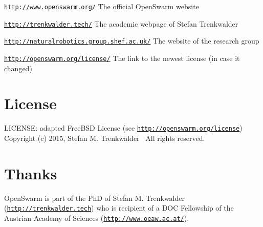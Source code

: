 \begin{DoxyItemize}
\item \href{http://www.openswarm.org/}{\tt http\+://www.\+openswarm.\+org/} The official Open\+Swarm website
\item \href{http://trenkwalder.tech/}{\tt http\+://trenkwalder.\+tech/} The academic webpage of Stefan Trenkwalder
\item \href{http://naturalrobotics.group.shef.ac.uk/}{\tt http\+://naturalrobotics.\+group.\+shef.\+ac.\+uk/} The website of the research group
\item \href{http://openswarm.org/license/}{\tt http\+://openswarm.\+org/license/} The link to the newest license (in case it changed)
\end{DoxyItemize}\hypertarget{index_base_license}{}\section{License}\label{index_base_license}
L\+I\+C\+E\+N\+S\+E\+: adapted Free\+B\+S\+D License (see \href{http://openswarm.org/license}{\tt http\+://openswarm.\+org/license})~\newline
Copyright (c) 2015, Stefan M. Trenkwalder~\newline
All rights reserved.\hypertarget{index_base_thanks}{}\section{Thanks}\label{index_base_thanks}
Open\+Swarm is part of the Ph\+D of Stefan M. Trenkwalder (\href{http://trenkwalder.tech}{\tt http\+://trenkwalder.\+tech}) who is recipient of a D\+O\+C Fellowship of the Austrian Academy of Sciences (\href{http://www.oeaw.ac.at/}{\tt http\+://www.\+oeaw.\+ac.\+at/}). 